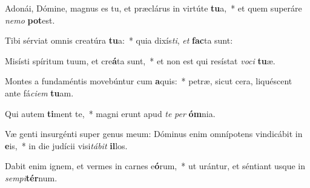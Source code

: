 \item Adonái, Dómine, magnus es tu, et præclárus in virtúte \textbf{tu}a,~* et quem superáre \textit{ne}\textit{mo} \textbf{pot}est.
\item Tibi sérviat omnis creatúra \textbf{tu}a:~* quia dixís\textit{ti}, \textit{et} \textbf{fac}ta sunt:
\item Misísti spíritum tuum, et cre\textbf{á}ta sunt,~* et non est qui resístat \textit{vo}\textit{ci} \textbf{tu}æ.
\item Montes a fundaméntis movebúntur cum \textbf{a}quis:~* petræ, sicut cera, liquéscent ante fá\textit{ci}\textit{em} \textbf{tu}am.
\item Qui autem \textbf{ti}ment te,~* magni erunt apud \textit{te} \textit{per} \textbf{óm}nia.
\item Væ genti insurgénti super genus meum: Dóminus enim omnípotens vindicábit in \textbf{e}is,~* in die judícii visi\textit{tá}\textit{bit} \textbf{il}los.
\item Dabit enim ignem, et vermes in carnes e\textbf{ó}rum,~* ut urántur, et séntiant usque in \textit{sem}\textit{pi}\textbf{tér}num.
